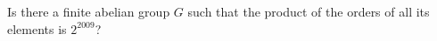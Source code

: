 Is there a finite abelian group $G$ such that the product of the orders of all its elements is $2^{2009}$?
